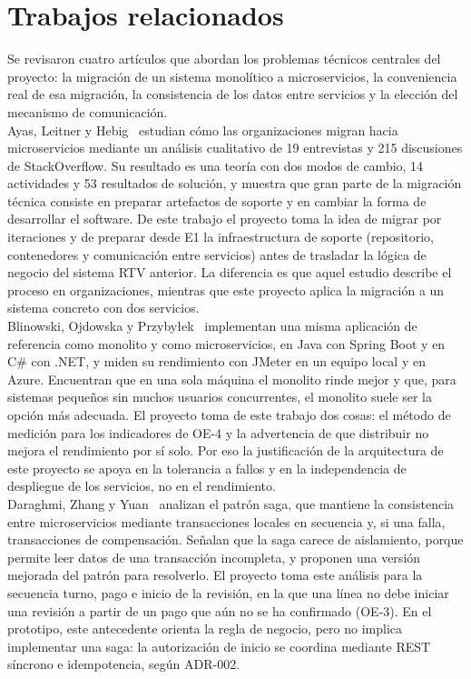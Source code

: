 \documentclass[11pt,a4paper]{article}
\begin{document}
	\section{Trabajos relacionados}
	Se revisaron cuatro artículos que abordan los problemas técnicos centrales del proyecto: la migración de un sistema monolítico a microservicios, la conveniencia real de esa migración, la consistencia de los datos entre servicios y la elección del mecanismo de comunicación.\\
	
	Ayas, Leitner y Hebig~\cite{ayas2023migration} estudian cómo las organizaciones migran hacia microservicios mediante un análisis cualitativo de 19 entrevistas y 215 discusiones de StackOverflow. Su resultado es una teoría con dos modos de cambio, 14 actividades y 53 resultados de solución, y muestra que gran parte de la migración técnica consiste en preparar artefactos de soporte y en cambiar la forma de desarrollar el software. De este trabajo el proyecto toma la idea de migrar por iteraciones y de preparar desde E1 la infraestructura de soporte (repositorio, contenedores y comunicación entre servicios) antes de trasladar la lógica de negocio del sistema RTV anterior. La diferencia es que aquel estudio describe el proceso en organizaciones, mientras que este proyecto aplica la migración a un sistema concreto con dos servicios.
	\\
	Blinowski, Ojdowska y Przybyłek~\cite{blinowski2022monolithic} implementan una misma aplicación de referencia como monolito y como microservicios, en Java con Spring Boot y en C\# con .NET, y miden su rendimiento con JMeter en un equipo local y en Azure. Encuentran que en una sola máquina el monolito rinde mejor y que, para sistemas pequeños sin muchos usuarios concurrentes, el monolito suele ser la opción más adecuada. El proyecto toma de este trabajo dos cosas: el método de medición para los indicadores de OE-4 y la advertencia de que distribuir no mejora el rendimiento por sí solo. Por eso la justificación de la arquitectura de este proyecto se apoya en la tolerancia a fallos y en la independencia de despliegue de los servicios, no en el rendimiento.
	\\
	
	Daraghmi, Zhang y Yuan~\cite{daraghmi2022saga} analizan el patrón saga, que mantiene la consistencia entre microservicios mediante transacciones locales en secuencia y, si una falla, transacciones de compensación. Señalan que la saga carece de aislamiento, porque permite leer datos de una transacción incompleta, y proponen una versión mejorada del patrón para resolverlo. El proyecto toma este análisis para la secuencia turno, pago e inicio de la revisión, en la que una línea no debe iniciar una revisión a partir de un pago que aún no se ha confirmado (OE-3). En el prototipo, este antecedente orienta la regla de negocio, pero no implica implementar una saga: la autorización de inicio se coordina mediante REST síncrono e idempotencia, según ADR-002.
	\\
	
\end{document}
